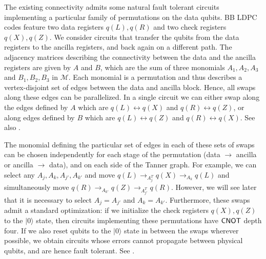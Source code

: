 \documentclass{article}
\begin{document}
The existing connectivity admits some natural fault tolerant circuits implementing a particular family of permutations on the data qubits. BB LDPC codes feature two data registers $q(L),q(R)$ and two
check registers $q(X),q(Z)$. We consider circuits that transfer the qubits from the data registers to the ancilla registers, and back again on a different path. The adjacency matrices describing the connectivity between the data and the ancilla registers are given by $A$ and $B$, which are the sum of three monomials $A_1, A_2, A_3$ and $B_1,B_2,B_3$ in $\mathcal{M}$. Each monomial is a permutation and thus describes a vertex-disjoint set of edges between the data and ancilla block. Hence, all swaps along these edges can be parallelized.
In a single circuit we can either swap along the edges defined by $A$ which are $q(L)\leftrightarrow q(X)$ and $q(R)\leftrightarrow q(Z)$, or along edges defined by $B$ which are $q(L)\leftrightarrow q(Z)$ and $q(R)\leftrightarrow q(X)$. See also . 

The monomial defining the particular set of edges in each of these sets of swaps can be chosen independently for each stage of the permutation (data $\to$ ancilla or ancilla $\to$ data), and on each side of the Tanner graph. 
For example, we can select any $A_j, A_k, A_{j'}, A_{k'}$ and move $q(L) \to_{A_j^T} q(X) \to_{A_{k}} q(L)$ and simultaneously move $q(R) \to_{A_{k'}} q(Z) \to_{A_{j'}^T} q(R)$. However, we will see later that it is necessary to select $A_j = A_{j'}$ and $A_k = A_{k'}$. Furthermore, these swaps admit a standard optimization: if we initialize the check registers $q(X),q(Z)$ to the $|0\rangle$ state, then circuits implementing these permutations have $\mathsf{CNOT}$ depth four. If we also reset qubits to the $|0\rangle$ state in between the swaps wherever possible, we obtain circuits whose errors cannot propagate between physical qubits, and are hence fault tolerant. See .
\end{document}
